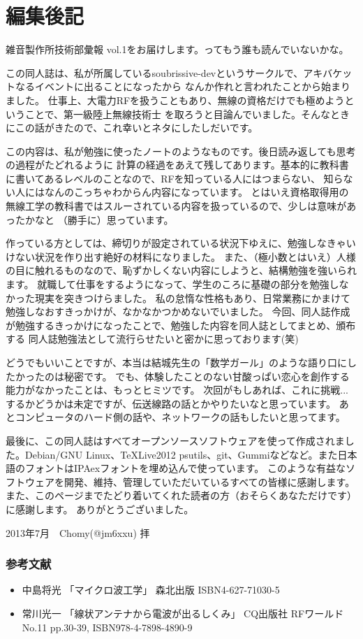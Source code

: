 \chapter*{編集後記}
雑音製作所技術部彙報 vol.1をお届けします。ってもう誰も読んでいないかな。

この同人誌は、私が所属しているsoubrissive-devというサークルで、アキバケットなるイベントに出ることになったから
なんか作れと言われたことから始まりました。
仕事上、大電力RFを扱うこともあり、無線の資格だけでも極めようということで、第一級陸上無線技術士
を取ろうと目論んでいました。そんなときにこの話がきたので、これ幸いとネタにしたしだいです。

この内容は、私が勉強に使ったノートのようなものです。後日読み返しても思考の過程がたどれるように
計算の経過をあえて残してあります。基本的に教科書に書いてあるレベルのことなので、RFを知っている人にはつまらない、
知らない人にはなんのこっちゃわからん内容になっています。
とはいえ資格取得用の無線工学の教科書ではスルーされている内容を扱っているので、少しは意味があったかなと
（勝手に）思っています。

作っている方としては、締切りが設定されている状況下ゆえに、勉強しなきゃいけない状況を作り出す絶好の材料になりました。
また、（極小数とはいえ）人様の目に触れるものなので、恥ずかしくない内容にしようと、結構勉強を強いられます。
就職して仕事をするようになって、学生のころに基礎の部分を勉強しなかった現実を突きつけらました。
私の怠惰な性格もあり、日常業務にかまけて勉強しなおすきっかけが、なかなかつかめないでいました。
今回、同人誌作成が勉強するきっかけになったことで、勉強した内容を同人誌としてまとめ、頒布する
同人誌勉強法として流行らせたいと密かに思っております(笑)

どうでもいいことですが、本当は結城先生の「数学ガール」のような語り口にしたかったのは秘密です。
でも、体験したことのない甘酸っぱい恋心を創作する能力がなかったことは、もっとヒミツです。
次回がもしあれば、これに挑戦...するかどうかは未定ですが、伝送線路の話とかやりたいなと思っています。
あとコンピュータのハード側の話や、ネットワークの話もしたいと思ってます。

最後に、この同人誌はすべてオープンソースソフトウェアを使って作成されました。Debian/GNU Linux、\TeX Live2012
psutils、git、Gummiなどなど。また日本語のフォントはIPAexフォントを埋め込んで使っています。
このような有益なソフトウェアを開発、維持、管理していただいているすべての皆様に感謝します。
また、このページまでたどり着いてくれた読者の方（おそらくあなただけです）に感謝します。
ありがとうございました。

\begin{flushright}
2013年7月　Chomy(@jm6xxu) 拝\\
\end{flushright}

\subsection*{参考文献}
\begin{itemize}
  \item 中島将光
    「マイクロ波工学」 森北出版 ISBN4-627-71030-5
  \item 常川光一
    「線状アンテナから電波が出るしくみ」 CQ出版社 RFワールド No.11 pp.30-39, ISBN978-4-7898-4890-9
\end{itemize}